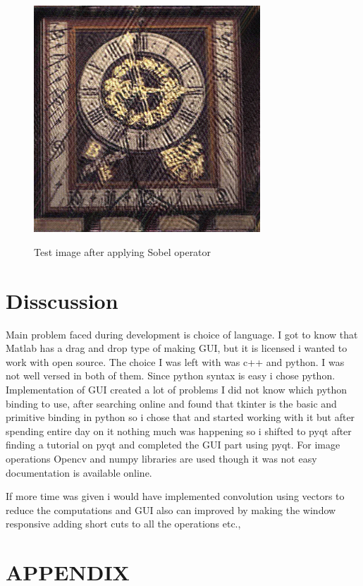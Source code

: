 \documentclass{article}
\begin{document}
\begin{figure}[htb]

\begin{minipage}[b]{1.0\linewidth}
  \centering
  \centerline{\includegraphics[width=8.5cm]{temp.jpg}}
  \centerline{Test image after applying Sobel operator}\medskip
\end{minipage}
%
\end{figure}






\section{Disscussion}
\label{sec:ref}

Main problem faced during development is choice of language. I got to know that Matlab has a drag and drop type of making GUI, but it is licensed i wanted to work with open source. The choice I was left with was c++ and python. I was not well versed in both of them. Since python syntax is easy i chose python. Implementation of  GUI created a lot of problems I did not know which python binding to use, after searching online and found that tkinter is the basic and primitive binding in python so i chose that and started working with it but after spending entire day on it nothing much was happening so i shifted to pyqt after finding a tutorial\cite{WEBSITE:9} on pyqt and completed the GUI part using pyqt. For image operations Opencv \cite{WEBSITE:3}and numpy\cite{WEBSITE:1} libraries are used though it was not easy documentation is available online.

 If more time was given i would have implemented convolution using vectors to reduce the computations and GUI also can improved by  making the window responsive adding short cuts to all the operations etc.,



\onecolumn
\section{APPENDIX}

\end{document}
